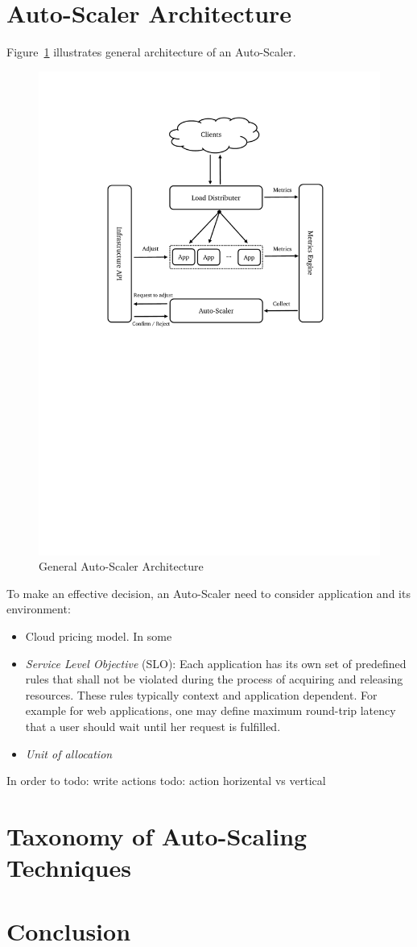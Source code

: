 \section{Auto-Scaler Architecture}
\label{ias:arch}
Figure~\ref{fig:auto-scaler-arch} illustrates general architecture of an Auto-Scaler.
\begin{figure}[h]
    \centering
    \includegraphics[clip, trim=3cm 13cm 2.5cm 2cm]{auto-scaler-arch.pdf}
    \caption{General Auto-Scaler Architecture}
    \label{fig:auto-scaler-arch}
\end{figure}

To make an effective decision, an Auto-Scaler need to consider application and its environment:
\begin{itemize}
    \item Cloud pricing model. In some 
    \item \emph{Service Level Objective} (SLO): Each application has its own set of predefined rules that shall not be violated during the process of acquiring and releasing resources. These rules typically context and application dependent. For example for web applications, one may define maximum round-trip latency that a user should wait until her request is fulfilled. 
    \item \emph{Unit of allocation}
\end{itemize}

In order to 
todo: write actions
todo: action horizental vs vertical

\section{Taxonomy of Auto-Scaling Techniques}
\label{ias:taxonomy}

\section{Conclusion}
\label{ias:conc}